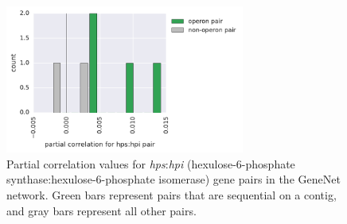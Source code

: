\begin{figure}[H]
\centering
    \includegraphics[width=0.7\textwidth]{./tex/chapter3/figures/hps-hpi_sequential_pairs_have_higher_pcor--GeneNet--1e+06_genes.pdf}
    \begin{singlespace}
    \caption[Partial correlation values for \textit{hps}:\textit{hpi} subunit pairs]{
    	Partial correlation values for \textit{hps}:\textit{hpi} (hexulose-6-phosphate synthase:hexulose-6-phosphate isomerase) gene pairs in the GeneNet network.
	    Green bars represent pairs that are sequential on a contig, and gray bars represent all other pairs.
        }
        \label{fig:hps_hpi_pcors}
    \end{singlespace}
\end{figure}


